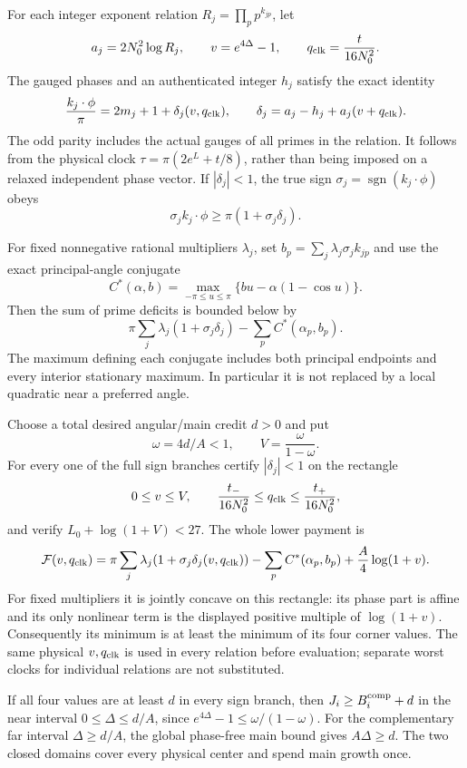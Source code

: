 \documentclass[11pt,a4paper]{article}
\theoremstyle{definition}
\theoremstyle{remark}
\begin{document}
For each integer exponent relation $R_j=\prod_pp^{k_{jp}}$, let
\[
 a_j=2N_0^2\log R_j,\qquad
 v=e^{4\Delta}-1,\qquad q_{\rm clk}=\frac{t}{16N_0^2}.
\]
The gauged phases and an authenticated integer $h_j$ satisfy the exact
identity
\begin{equation}
 \frac{k_j\cdot\phi}{\pi}=2m_j+1+\delta_j(v,q_{\rm clk}),
 \qquad
 \delta_j=a_j-h_j+a_j(v+q_{\rm clk}).
 \label{src:clock-relation}
\end{equation}
The odd parity includes the actual gauges of all primes in the relation.
It follows from the physical clock
$\tau=\pi(2e^L+t/8)$, rather than being imposed on a relaxed independent
phase vector.  If $|\delta_j|<1$, the true sign
$\sigma_j=\operatorname{sgn}(k_j\cdot\phi)$ obeys
\[
 \sigma_j k_j\cdot\phi\geq\pi(1+\sigma_j\delta_j).
\]

For fixed nonnegative rational multipliers $\lambda_j$, set
$b_p=\sum_j\lambda_j\sigma_jk_{jp}$ and use the exact principal-angle
conjugate
\[
 C^*(\alpha,b)=\max_{-\pi\leq u\leq\pi}
                           \{bu-\alpha(1-\cos u)\}.
\]
Then the sum of prime deficits is bounded below by
\[
 \pi\sum_j\lambda_j(1+\sigma_j\delta_j)
                                -\sum_pC^*(\alpha_p,b_p).
\]
The maximum defining each conjugate includes both principal endpoints
and every interior stationary maximum.  In particular it is not replaced
by a local quadratic near a preferred angle.

Choose a total desired angular/main credit $d>0$ and put
\[
 \omega=4d/A<1,\qquad V=\frac{\omega}{1-\omega}.
\]
For every one of the full sign branches certify $|\delta_j|<1$ on the
rectangle
\[
 0\leq v\leq V,\qquad
 \frac{t_-}{16N_0^2}\leq q_{\rm clk}\leq\frac{t_+}{16N_0^2},
\]
and verify $L_0+\log(1+V)<27$.  The whole lower payment is
\begin{equation}
 \mathcal F(v,q_{\rm clk})=
 \pi\sum_j\lambda_j(1+\sigma_j\delta_j(v,q_{\rm clk}))
 -\sum_pC^*(\alpha_p,b_p)+\frac A4\log(1+v).
 \label{src:clock-payment}
\end{equation}
For fixed multipliers it is jointly concave on this rectangle: its
phase part is affine and its only nonlinear term is the displayed
positive multiple of $\log(1+v)$.  Consequently its minimum is at least
the minimum of its four corner values.  The same physical $v,q_{\rm clk}$
is used in every relation before evaluation; separate worst clocks for
individual relations are not substituted.

If all four values are at least $d$ in every sign branch, then
$J_i\geq B_i^{\rm comp}+d$ in the near interval $0\leq\Delta\leq d/A$,
since $e^{4\Delta}-1\leq\omega/(1-\omega)$.  For the complementary
far interval $\Delta\geq d/A$, the global phase-free main bound gives
$A\Delta\geq d$.  The two closed domains cover every physical center
and spend main growth once.
\end{document}
